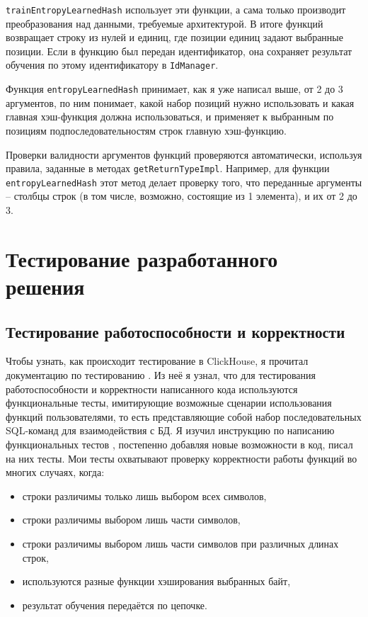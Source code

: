 \documentclass[a4paper,12pt]{extarticle}
\begin{document}
\begin{sloppypar}
\texttt{trainEntropyLearnedHash} использует эти функции, а сама только производит преобразования над данными, требуемые архитектурой. В итоге функций возвращает строку из нулей и единиц, где позиции единиц задают выбранные позиции. Если в функцию был передан идентификатор, она сохраняет результат обучения по этому идентификатору в \texttt{IdManager}.

Функция \texttt{entropyLearnedHash} принимает, как я уже написал выше, от 2 до 3 аргументов, по ним понимает, какой набор позиций нужно использовать и какая главная хэш-функция должна использоваться, и применяет к выбранным по позициям подпоследовательностям строк главную хэш-функцию.

Проверки валидности аргументов функций проверяются автоматически, используя правила, заданные в методах \texttt{getReturnTypeImpl}. Например, для функции \texttt{entropyLearnedHash} этот метод делает проверку того, что переданные аргументы -- столбцы строк (в том числе, возможно, состоящие из 1 элемента), и их от 2 до 3.

\newpage

\section{Тестирование разработанного решения}
\subsection{Тестирование работоспособности и корректности}
Чтобы узнать, как происходит тестирование в ClickHouse, я прочитал документацию по тестированию \cite{clickhouse_testing}. Из неё я узнал, что для тестирования работоспособности и корректности написанного кода используются функциональные тесты, имитирующие возможные сценарии использования функций пользователями, то есть представляющие собой набор последовательных SQL-команд для взаимодействия с БД. Я изучил инструкцию по написанию функциональных тестов \cite{clickhouse_sql_test_queries}, постепенно добавляя новые возможности в код, писал на них тесты. Мои тесты охватывают проверку корректности работы функций во многих случаях, когда:

\begin{itemize}
	\item строки различимы только лишь выбором всех символов,
	\item строки различимы выбором лишь части символов,
	\item строки различимы выбором лишь части символов при различных длинах строк,
	\item используются разные функции хэширования выбранных байт,
	\item результат обучения передаётся по цепочке.
\end{itemize}


\end{sloppypar}
\end{document}
